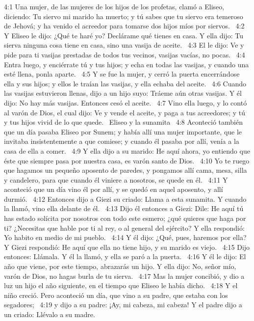4:1 Una mujer, de las mujeres de los hijos de los profetas, clamó a Eliseo, diciendo: Tu siervo mi marido ha muerto; y tú sabes que tu siervo era temeroso de Jehová; y ha venido el acreedor para tomarse dos hijos míos por siervos.  
4:2 Y Eliseo le dijo: ¿Qué te haré yo? Declárame qué tienes en casa. Y ella dijo: Tu sierva ninguna cosa tiene en casa, sino una vasija de aceite.  
4:3 El le dijo: Ve y pide para ti vasijas prestadas de todos tus vecinos, vasijas vacías, no pocas.  
4:4 Entra luego, y enciérrate tú y tus hijos; y echa en todas las vasijas, y cuando una esté llena, ponla aparte.  
4:5 Y se fue la mujer, y cerró la puerta encerrándose ella y sus hijos; y ellos le traían las vasijas, y ella echaba del aceite.  
4:6 Cuando las vasijas estuvieron llenas, dijo a un hijo suyo: Tráeme aún otras vasijas. Y él dijo: No hay más vasijas. Entonces cesó el aceite.  
4:7 Vino ella luego, y lo contó al varón de Dios, el cual dijo: Ve y vende el aceite, y paga a tus acreedores; y tú y tus hijos vivid de lo que quede.  
Eliseo y la sunamita  
4:8 Aconteció también que un día pasaba Eliseo por Sunem; y había allí una mujer importante, que le invitaba insistentemente a que comiese; y cuando él pasaba por allí, venía a la casa de ella a comer.  
4:9 Y ella dijo a su marido: He aquí ahora, yo entiendo que éste que siempre pasa por nuestra casa, es varón santo de Dios.  
4:10 Yo te ruego que hagamos un pequeño aposento de paredes, y pongamos allí cama, mesa, silla y candelero, para que cuando él viniere a nosotros, se quede en él.  
4:11 Y aconteció que un día vino él por allí, y se quedó en aquel aposento, y allí durmió.  
4:12 Entonces dijo a Giezi su criado: Llama a esta sunamita. Y cuando la llamó, vino ella delante de él.  
4:13 Dijo él entonces a Giezi: Dile: He aquí tú has estado solícita por nosotros con todo este esmero; ¿qué quieres que haga por ti? ¿Necesitas que hable por ti al rey, o al general del ejército? Y ella respondió: Yo habito en medio de mi pueblo.  
4:14 Y él dijo: ¿Qué, pues, haremos por ella? Y Giezi respondió: He aquí que ella no tiene hijo, y su marido es viejo.  
4:15 Dijo entonces: Llámala. Y él la llamó, y ella se paró a la puerta.  
4:16 Y él le dijo: El año que viene, por este tiempo, abrazarás un hijo. Y ella dijo: No, señor mío, varón de Dios, no hagas burla de tu sierva.  
4:17 Mas la mujer concibió, y dio a luz un hijo el año siguiente, en el tiempo que Eliseo le había dicho.  
4:18 Y el niño creció. Pero aconteció un día, que vino a su padre, que estaba con los segadores;  
4:19 y dijo a su padre: ¡Ay, mi cabeza, mi cabeza! Y el padre dijo a un criado: Llévalo a su madre.  
